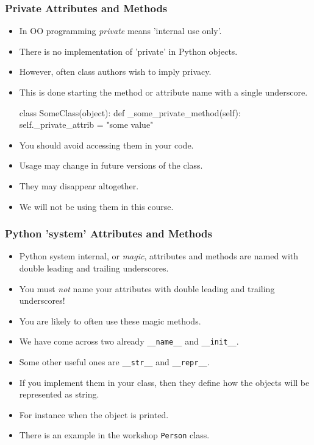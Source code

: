 \documentclass{beamer}
\begin{document}
\begin{frame}[fragile]
\frametitle{Private Attributes and Methods}

\begin{itemize}
\item In OO programming \emph{private} means 'internal use only'.
\item There is no implementation of 'private' in Python objects.
\item However, often class authors wish to imply privacy.
\item This is done starting the method or attribute name with a single underscore.
\begin{code}
class SomeClass(object):
  def _some_private_method(self):
    self._private_attrib = "some value"
\end{code}

\item You should avoid accessing them in your code.
\item Usage may change in future versions of the class.
\item They may disappear altogether.
\item We will not be using them in this course.
\end{itemize}

\end{frame}

\begin{frame}[fragile]
\frametitle{Python 'system' Attributes and Methods}
\begin{itemize}
\item Python system internal, or \emph{magic}, attributes and methods are
named with double leading and trailing underscores.
\item You must \emph{not} name your attributes with double leading and trailing underscores!
\item You are likely to often use these magic methods.
\item We have come across two already \lstinline|__name__| and \lstinline|__init__|.
\item Some other useful ones are \lstinline|__str__| and \lstinline|__repr__|.
\item If you implement them in your class, then they define how the objects will be represented as string.
\item For instance when the object is printed.
\item There is an example in the workshop \lstinline|Person| class.
\end{itemize}
\end{frame}
\end{document}
